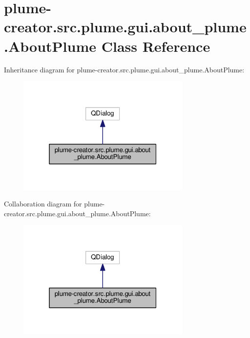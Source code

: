 \hypertarget{classplume-creator_1_1src_1_1plume_1_1gui_1_1about__plume_1_1_about_plume}{}\section{plume-\/creator.src.\+plume.\+gui.\+about\+\_\+plume.\+About\+Plume Class Reference}
\label{classplume-creator_1_1src_1_1plume_1_1gui_1_1about__plume_1_1_about_plume}


Inheritance diagram for plume-\/creator.src.\+plume.\+gui.\+about\+\_\+plume.\+About\+Plume\+:\nopagebreak
\begin{figure}[H]
\begin{center}
\leavevmode
\includegraphics[width=244pt]{classplume-creator_1_1src_1_1plume_1_1gui_1_1about__plume_1_1_about_plume__inherit__graph}
\end{center}
\end{figure}


Collaboration diagram for plume-\/creator.src.\+plume.\+gui.\+about\+\_\+plume.\+About\+Plume\+:\nopagebreak
\begin{figure}[H]
\begin{center}
\leavevmode
\includegraphics[width=244pt]{classplume-creator_1_1src_1_1plume_1_1gui_1_1about__plume_1_1_about_plume__coll__graph}
\end{center}
\end{figure}
